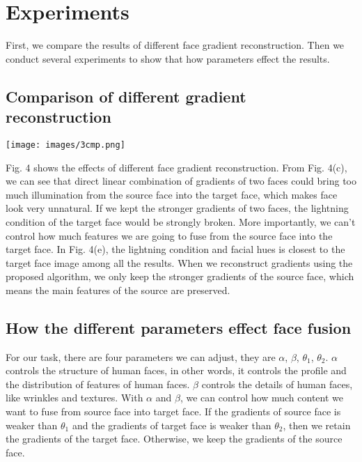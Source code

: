 \section{Experiments}
First, we compare the results of different face gradient reconstruction. Then we conduct several experiments to show that how parameters effect the  results.
\subsection{Comparison of different gradient reconstruction}
\begin{center}
    \texttt{[image: images/3cmp.png]}
\end{center}

Fig. 4 shows the effects of different face gradient reconstruction. From Fig. 4(c), we can see that direct linear combination of  gradients of two faces could bring too much illumination from the source face into the target face, which makes face look very unnatural. If we kept the stronger gradients of two faces, the lightning condition of the target face would be strongly broken. More importantly, we can't control how much features we are going to fuse from the source face into the target face. In Fig. 4(e), the lightning condition and facial hues is closest to the target face image among all the results. When we reconstruct gradients using the proposed algorithm, we only keep the stronger gradients of the source face, which means the main features of the source are preserved.

\subsection{How the different parameters effect face fusion}
 For our task, there are four parameters we can adjust, they are $\alpha$, $\beta$, $\theta_1$, $\theta_2$. $\alpha$ controls the structure of human faces, in other words, it controls the profile and the distribution of features of human faces. $\beta$ controls the details of human faces, like wrinkles and textures. With $\alpha$ and $\beta$, we can control how much content we want to fuse from source face into target face. If the gradients of source face is weaker than $\theta_1$ and the gradients of target face is weaker than $\theta_2$, then we retain the gradients of the target face. Otherwise, we keep the gradients of the source face.

